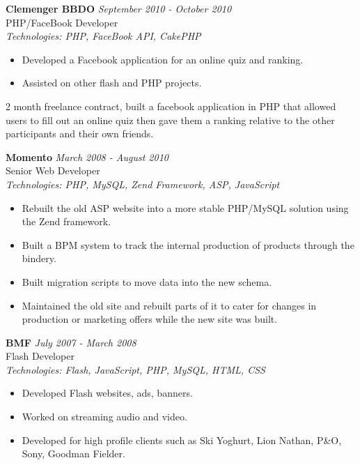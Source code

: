 \documentclass[a4paper,10pt]{article}
\begin{document}
\textbf{Clemenger BBDO} \hfill \textit{September 2010 - October 2010} \\
PHP/FaceBook Developer \\
\textit{Technologies: PHP, FaceBook API, CakePHP}
\begin{itemize}
    \item Developed a Facebook application for an online quiz and ranking.
    \item Assisted on other flash and PHP projects.
\end{itemize}

2 month freelance contract, built a facebook application in PHP that allowed users to fill out an online quiz then gave them a ranking relative to the other participants and their own friends.

\vspace{1em}

\textbf{Momento} \hfill \textit{March 2008 - August 2010} \\
Senior Web Developer \\
\textit{Technologies: PHP, MySQL, Zend Framework, ASP, JavaScript}
\begin{itemize}
    \item Rebuilt the old ASP website into a more stable PHP/MySQL solution using the Zend framework.
    \item Built a BPM system to track the internal production of products through the bindery.
    \item Built migration scripts to move data into the new schema.
    \item Maintained the old site and rebuilt parts of it to cater for changes in production or marketing offers while the new site was built.
\end{itemize}

\vspace{1em}

\textbf{BMF} \hfill \textit{July 2007 - March 2008} \\
Flash Developer \\
\textit{Technologies: Flash, JavaScript, PHP, MySQL, HTML, CSS}
\begin{itemize}
    \item Developed Flash websites, ads, banners.
    \item Worked on streaming audio and video.
    \item Developed for high profile clients such as Ski Yoghurt, Lion Nathan, P\&O, Sony, Goodman Fielder.
\end{itemize}
\end{document}
